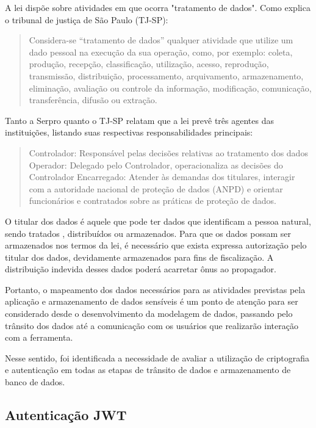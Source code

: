 \documentclass[
    12pt,               %
    openright,          %
    oneside,
    a4paper,            %
    BIBLATEX,           %
    TODO,               %
    english,            %
    brazil              %
    ]{ifsp-spo-inf-ctds}
\begin{document}
            A lei dispõe sobre atividades em que ocorra "tratamento de dados". Como explica o tribunal de justiça de São Paulo (TJ-SP):

            \begin{quote}
                Considera-se “tratamento de dados” qualquer atividade que utilize um dado pessoal na execução da sua operação, como, por exemplo: coleta, produção, recepção, classificação, utilização, acesso, reprodução, transmissão, distribuição, processamento, arquivamento, armazenamento, eliminação, avaliação ou controle da informação, modificação, comunicação, transferência, difusão ou extração.
            \end{quote}

            Tanto a Serpro quanto o TJ-SP relatam que a lei prevê três agentes das instituições, listando suas respectivas responsabilidades principais:

            \begin{quote}
                Controlador: Responsável pelas decisões relativas ao tratamento dos dados
                Operador: Delegado pelo Controlador, operacionaliza as decisões do Controlador
                Encarregado: Atender às demandas dos titulares, interagir com a autoridade nacional de proteção de dados (ANPD) e orientar funcionários e contratados sobre as práticas de proteção de dados.
            \end{quote}

            O titular dos dados é aquele que pode ter dados que identificam a pessoa natural, sendo tratados , distribuídos ou armazenados. Para que os dados possam ser armazenados nos termos da lei, é necessário que exista expressa autorização pelo titular dos dados, devidamente armazenados para fins de fiscalização. A distribuição indevida desses dados poderá acarretar ônus ao propagador. \cite{lgpdComoCumprir}

            Portanto, o mapeamento dos dados necessários para as atividades previstas pela aplicação e armazenamento de dados sensíveis é um ponto de atenção para ser considerado desde o desenvolvimento da modelagem de dados, passando pelo trânsito dos dados até a comunicação com os usuários que realizarão interação com a ferramenta.

            Nesse sentido, foi identificada a necessidade de avaliar a utilização de criptografia e autenticação em todas as etapas de trânsito de dados e armazenamento de banco de dados.

        \subsection{Autenticação JWT}
\end{document}
